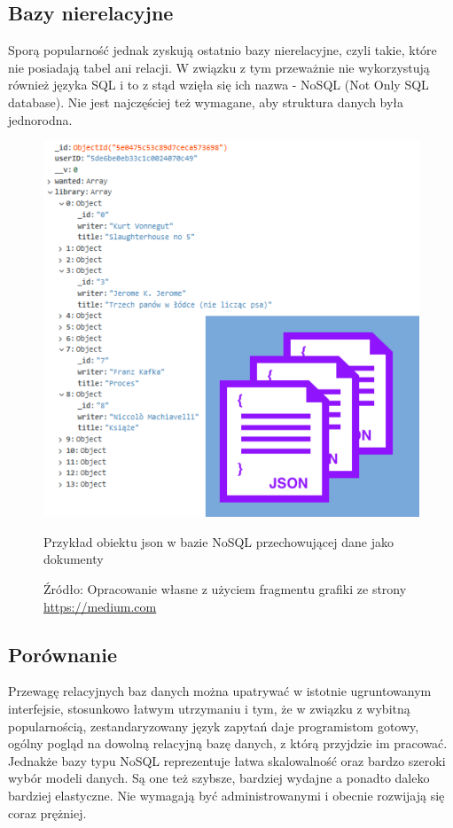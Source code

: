 \subsection{Bazy nierelacyjne}
Sporą popularność jednak zyskują ostatnio bazy nierelacyjne, czyli takie, które nie posiadają tabel ani relacji. W związku z tym przeważnie nie wykorzystują również języka SQL i to z stąd wzięła się ich nazwa - NoSQL (Not Only SQL database). Nie jest najczęściej też wymagane, aby struktura danych była jednorodna.
\begin{figure}[H]
	\centering
	\includegraphics[width=\linewidth]{nosql.pdf}
	\caption{Przykład obiektu json w bazie NoSQL przechowującej dane jako dokumenty}
	\caption*{Źródło: {Opracowanie własne z użyciem fragmentu grafiki ze strony \url{https://medium.com}}}
\end{figure}

\subsection{Porównanie}
Przewagę relacyjnych baz danych można upatrywać w istotnie ugruntowanym interfejsie, stosunkowo łatwym utrzymaniu i tym, że w związku z wybitną popularnością, zestandaryzowany język zapytań daje programistom gotowy, ogólny pogląd na dowolną relacyjną bazę danych, z którą przyjdzie im pracować.
Jednakże bazy typu NoSQL reprezentuje łatwa skalowalność oraz bardzo szeroki wybór modeli danych. Są one też szybsze, bardziej wydajne a ponadto daleko bardziej elastyczne. Nie wymagają być administrowanymi i obecnie rozwijają się coraz prężniej.~\cite{database}

